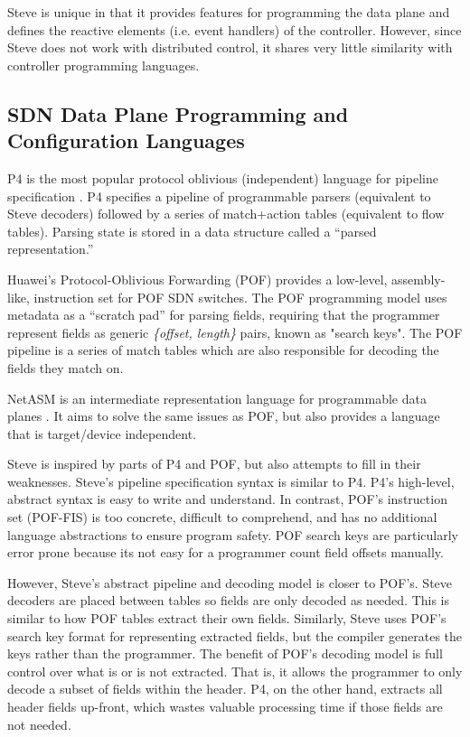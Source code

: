 Steve is unique in that it provides features for programming the data plane
and defines the reactive elements (i.e. event handlers) of the controller. However, since Steve
does not work with distributed control, it shares very little similarity with 
controller programming languages.

\subsection{SDN Data Plane Programming and Configuration Languages} \label{rel:p4}

P4 is the most popular protocol oblivious (independent) language for pipeline specification
 \cite{p4_spec, p4_spec2, p42014}.
P4 specifies a pipeline of programmable parsers (equivalent to Steve decoders) followed
by a series of match+action
tables (equivalent to flow tables). Parsing state is stored in a data structure
called a ``parsed representation.''

Huawei's Protocol-Oblivious Forwarding (POF) \cite{pof_fis, pof, pof_impl} provides a
low-level, assembly-like, instruction set for POF SDN switches. 
The POF programming model uses metadata as a ``scratch pad'' for parsing fields,
requiring that the programmer represent fields as generic \textit{\{offset, length\}} pairs, 
known as "search keys". The POF pipeline is a series of match tables which are also
responsible for decoding the fields they match on.

NetASM is an intermediate representation language for programmable data planes
\cite{shahbaz2015netasm}. It aims to solve the same issues as POF, but also provides a language that is target/device independent.

Steve is inspired by parts of P4 and POF, but also attempts to
fill in their weaknesses. 
Steve's pipeline specification syntax is similar to P4.
P4's high-level, abstract syntax is easy to write and understand. 
In contrast, POF's instruction set (POF-FIS) \cite{pof_fis} is too
concrete, difficult to comprehend, and has no additional language
abstractions to ensure program safety.
POF search keys are particularly error prone because its not easy
for a programmer count field offsets manually.

However, Steve's abstract pipeline and decoding model is closer to POF's.
Steve decoders are placed between tables so fields are only decoded
as needed. This is similar to how POF tables extract their own fields.
Similarly, Steve uses POF's search key format for representing extracted fields, but the compiler generates the keys rather than the programmer.
The benefit of POF's decoding model is full control over what is or is not
extracted. 
That is, it allows the programmer to only decode a subset of fields within the header.
P4, on the other hand, extracts all header fields up-front, which wastes 
valuable processing time if those fields are not needed.




